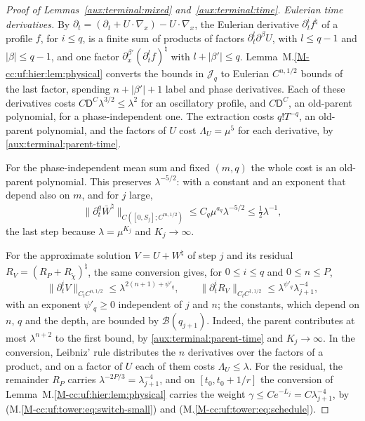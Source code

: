 \documentclass[11pt]{amsart}
\numberwithin{equation}{section}
\newcommand{\Holder}[1]{C^{#1,1/2}}
\begin{document}
\begin{proof}[Proof of Lemmas~\ref{aux:terminal:mixed} and~\ref{aux:terminal:time}]
\emph{Eulerian time derivatives.} By
$\partial_t=(\partial_t+U\cdot\nabla_x)-U\cdot\nabla_x$, the Eulerian
derivative $\partial_t^if^\natural$ of a profile $f$, for $i\le q$, is a
finite sum of products of factors $\partial_t^l\partial^\beta U$, with
$l\le q-1$ and $|\beta|\le q-1$, and one factor
$\partial_x^{\beta'}(\partial_t^lf)^\natural$ with $l+|\beta'|\le q$.
Lemma~M.\ref{M-cc:uf:hier:lem:physical} converts the bounds in
$\mathcal J_q$ to Eulerian $\Holder{n}$ bounds of the last factor,
spending $n+|\beta'|+1$ label and phase derivatives. Each of these
derivatives costs $C\mathsf D^C\lambda^{3/2}\le\lambda^2$ for an oscillatory
profile, and $C\mathsf D^C$, an old-parent polynomial, for a
phase-independent one.
The extraction costs $q!T^{-q}$, an old-parent polynomial, and the
factors of $U$ cost
$\Lambda_U=\mu^5$ for each derivative, by
\eqref{aux:terminal:parent-time}.

For the phase-independent mean sum and fixed $(m,q)$ the whole cost is
an old-parent polynomial. This preserves $\lambda^{-5/2}$: with a
constant and an exponent that depend also on $m$, and for $j$ large,
\begin{equation}\label{aux:terminal:mean-mixed}
 \|\partial_t^q\bar W^\natural\|_{C([0,S_j];\Holder{m})}
 \le C_q\mu^{a_q}\lambda^{-5/2}\le\tfrac12\lambda^{-1},
\end{equation}
the last step because $\lambda=\mu^{K_j}$ and $K_j\to\infty$.

For the approximate solution $V=U+W^\natural$ of step $j$ and its
residual $R_V=(R_P+R_{\widetilde\chi})^\natural$, the same conversion
gives, for $0\le i\le q$ and $0\le n\le P$,
\begin{equation}\label{aux:terminal:V-mixed}
 \|\partial_t^iV\|_{C_t\Holder{n}}\le\lambda^{2(n+1)+\psi'_q},\qquad
 \|\partial_t^iR_V\|_{C_t\Holder{1}}
 \le\lambda^{\psi'_q}\lambda_{j+1}^{-4},
\end{equation}
with an exponent $\psi'_q\ge0$ independent of $j$ and $n$; the constants,
which depend on $n$, $q$ and the depth, are bounded by
$\mathcal B(q_{j+1})$. Indeed, the parent contributes at most $\lambda^{n+2}$ to the
first bound, by \eqref{aux:terminal:parent-time} and
$K_j\to\infty$. In the conversion, Leibniz' rule distributes
the $n$ derivatives over the factors of a product, and on a factor of $U$
each of them costs $\Lambda_U\le\lambda$. For
the residual, the remainder $R_P$ carries
$\lambda^{-2P/3}=\lambda_{j+1}^{-4}$, and on $[t_0,t_0+1/r]$
the conversion of Lemma~M.\ref{M-cc:uf:hier:lem:physical} carries the
weight $\gamma\le Ce^{-L_j}=C\lambda_{j+1}^{-4}$, by
\textup{(M.\ref{M-cc:uf:tower:eq:switch-small})} and
\textup{(M.\ref{M-cc:uf:tower:eq:schedule})}.


\end{proof}
\end{document}
